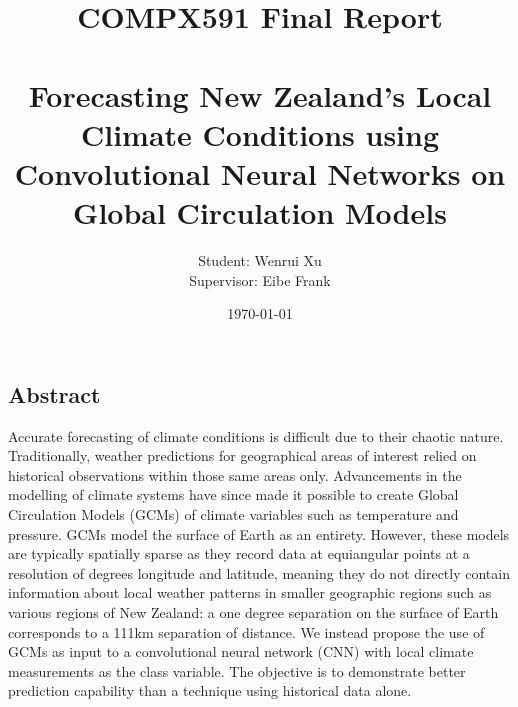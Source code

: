 \documentclass[11pt,a4paper, titlepage]{article}
\begin{document}
\title{\vspace{-3.5cm}\textbf{COMPX591 Final Report}  \\~\\ \Large {Forecasting New Zealand's Local Climate Conditions using Convolutional Neural Networks on Global Circulation Models}}
\author{Student: Wenrui Xu \\ Supervisor: Eibe Frank}
\date{\today}
\maketitle

\tableofcontents

\begin{center}
\section*{Abstract}
\end{center}
Accurate forecasting of climate conditions is difficult due to their chaotic nature. Traditionally, weather predictions for geographical areas of interest relied on historical observations within those same areas only. Advancements in the modelling of climate systems have since made it possible to create Global Circulation Models (GCMs) of climate variables such as temperature and pressure. GCMs model the surface of Earth as an entirety. However, these models are typically spatially sparse as they record data at equiangular points at a resolution of degrees longitude and latitude, meaning they do not directly contain information about local weather patterns in smaller geographic regions such as various regions of New Zealand: a one degree separation on the surface of Earth corresponds to a 111km separation of distance. We instead propose the use of GCMs as input to a convolutional neural network (CNN) with local climate measurements as the class variable. The objective is to demonstrate better prediction capability than a technique using historical data alone.

\pagebreak
\end{document}

